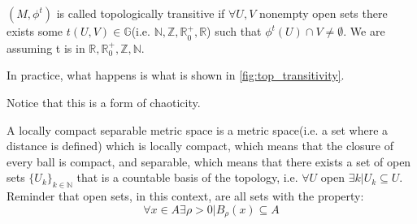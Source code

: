 \begin{definition}
    $(M, \phi^t)$ is called topologically transitive if $\forall U, V$ nonempty open sets there exists some $t(U, V)\in\mathbb{G}$(i.e. $\mathbb{N, Z, R}_0^+, \mathbb{R}$) such that $\phi^t(U)\cap V\neq \emptyset$. We are assuming t is in $\mathbb{R}, \mathbb{R}_0^+, \mathbb{Z},\mathbb{N}$.
\end{definition}

In practice, what happens is what is shown in \autoref{fig:top_transitivity}.

Notice that this is a form of chaoticity.

\begin{definition}
    A locally compact separable metric space is a metric space(i.e. a set where a distance is defined) which is locally compact, which means that the closure of every ball is compact, and separable, which means that there exists a set of open sets $\{U_k\}_{k\in\mathbb{N}}$ that is a countable basis of the topology, i.e. $\forall U$ open $\exists k|U_k\subseteq U$. Reminder that open sets, in this context, are all sets with the property: \begin{equation*}
    \forall x\in A \exists \rho>0|B_{\rho}(x)\subseteq A
    \end{equation*}
\end{definition}

